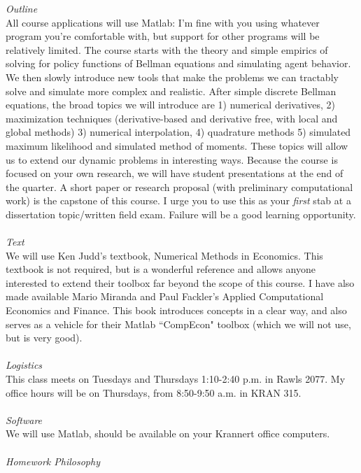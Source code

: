 \documentclass[a4paper]{article}
\begin{document}
\emph{Outline}\\
All course applications will use Matlab: I'm fine with you using whatever program you're comfortable with, but support for other programs will be relatively limited.  The course starts with the theory and simple empirics of solving for policy functions of Bellman equations and simulating agent behavior.  We then slowly introduce new tools that make the problems we can tractably solve and simulate more complex and realistic.  After simple discrete Bellman equations, the broad topics we will introduce are 1) numerical derivatives, 2) maximization techniques (derivative-based and derivative free, with local and global methods) 3)  numerical interpolation, 4) quadrature methods 5) simulated maximum likelihood and simulated method of moments.  These topics will allow us to extend our dynamic problems in interesting ways.  Because the course is focused on your own research, we will have student presentations at the end of the quarter.  A short paper or research proposal (with preliminary computational work) is the capstone of this course. I urge you to use this as your \emph{first} stab at a dissertation topic/written field exam.  Failure will be a good learning opportunity.\\
\ \\
\emph{Text}\\
We will use Ken Judd's textbook, Numerical Methods in Economics.  This textbook is not required, but is a wonderful reference and allows anyone interested to extend their toolbox far beyond the scope of this course. I have also made available Mario Miranda and Paul Fackler's Applied Computational Economics and Finance.  This book introduces concepts in a clear way, and also serves as a vehicle for their Matlab ``CompEcon" toolbox (which we will not use, but is very good). \\
\ \\
\emph{Logistics}\\
This class meets on Tuesdays and Thursdays 1:10-2:40 p.m. in Rawls 2077. My office hours will be on Thursdays, from 8:50-9:50 a.m. in KRAN 315.\\
\ \\
\emph{Software}\\
We will use Matlab, should be available on your Krannert office computers.  \\
\ \\
\emph{Homework Philosophy}\\
\end{document}
